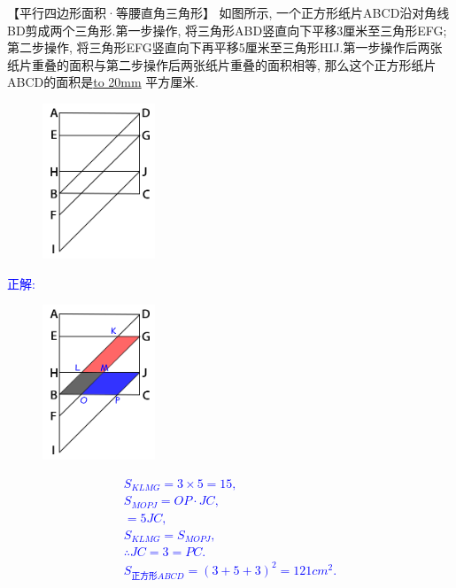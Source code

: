 \item {
    【平行四边形面积·等腰直角三角形】
    如图所示, 一个正方形纸片ABCD沿对角线BD剪成两个三角形.第一步操作, 将三角形ABD竖直向下平移3厘米至三角形EFG;第二步操作, 将三角形EFG竖直向下再平移5厘米至三角形HIJ.第一步操作后两张纸片重叠的面积与第二步操作后两张纸片重叠的面积相等, 那么这个正方形纸片ABCD的面积是\underline{\hbox to 20mm{}} 平方厘米.
    \begin{figure}[H] 
        \centering
        \includegraphics[width=0.3\textwidth]{./pics/Chapter_2/10.png}
    \end{figure}
    \ifshowSolution 
        \fangsong{}\textcolor{blue}{
            正解: \\
            \begin{figure}[H] 
                \centering
                \includegraphics[width=0.3\textwidth]{./pics/Chapter_2/seikai_10.png}
            \end{figure}
            \begin{gather*}
                S_{KLMG} = 3\times 5 = 15, \\
                S_{MOPJ} = OP\cdot JC, \\
                = 5JC, \\
                S_{KLMG} = S_{MOPJ},\\
                \therefore JC = 3 = PC.\\
                S_{正方形ABCD} = (3+5+3)^2 = 121 {cm}^2.\\
            \end{gather*}
        }
    \else
        \vspace{1cm}
    \fi
}


